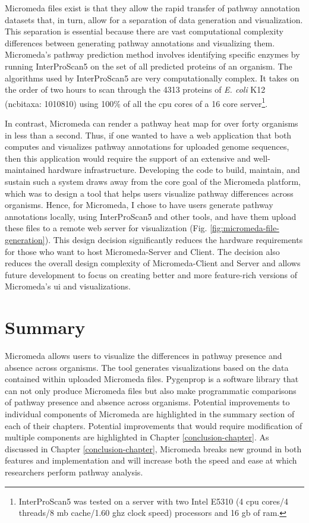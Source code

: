 Micromeda files exist is that they allow the rapid transfer of pathway 
annotation datasets that, in turn, allow for a separation of data generation and 
visualization. This separation is essential because there are vast computational 
complexity differences between generating pathway annotations and visualizing 
them. Micromeda's pathway prediction method involves identifying 
specific enzymes by running InterProScan5 on the set of all predicted proteins 
of an organism. The algorithms used by InterProScan5 are very computationally 
complex. It takes on the order of two hours to scan through the 4313 proteins of 
\textit{E. coli} K12 (\gls{ncbitaxa}: 1010810) using 100\% of all the \gls{cpu} 
cores of a 16 core server\footnote{InterProScan5 was tested on a server with two 
Intel E5310 (4 \gls{cpu} cores/4 threads/8 \gls{mb} cache/1.60 \gls{ghz} clock 
speed) processors and 16 \gls{gb}  of \gls{ram}.}.

In contrast, Micromeda can render a pathway heat map for over forty organisms in 
less than a second. Thus, if one wanted to have a web application that both 
computes and visualizes pathway annotations for uploaded genome sequences, then 
this application would require the support of an extensive and well-maintained 
hardware infrastructure. Developing the code to build, maintain, and sustain 
such a system draws away from the core goal of the Micromeda platform, which was 
to design a tool that helps users visualize pathway differences across 
organisms. Hence, for Micromeda, I chose to have users generate pathway 
annotations locally, using InterProScan5 and other tools, and have them upload 
these files to a remote web server for visualization (Fig. 
\ref{fig:micromeda-file-generation}). This design decision significantly reduces 
the hardware requirements for those who want to host Micromeda-Server and 
Client. The decision also reduces the overall design complexity of 
Micromeda-Client and Server and allows future development to focus on creating 
better and more feature-rich versions of Micromeda's \gls{ui} and 
visualizations.

\section{Summary} \label{introduction_summary}

Micromeda allows users to visualize the differences in pathway presence and 
absence across organisms. The tool generates visualizations based on the data 
contained within uploaded Micromeda files. Pygenprop is a software library that 
can not only produce Micromeda files but also make programmatic comparisons of 
pathway presence and absence across organisms. Potential improvements to 
individual components of Micromeda are highlighted in the summary section of 
each of their chapters. Potential improvements that would require modification 
of multiple components are highlighted in Chapter \ref{conclusion-chapter}. As 
discussed in Chapter \ref{conclusion-chapter}, Micromeda breaks new ground in 
both features and implementation and will increase both the speed and ease at 
which researchers perform pathway analysis.